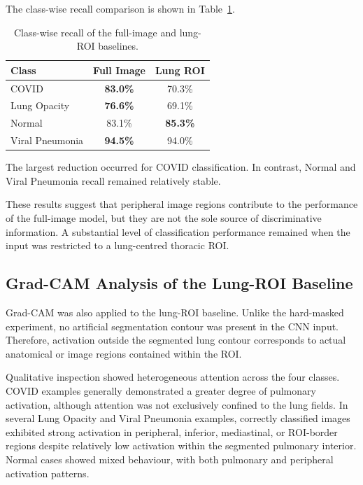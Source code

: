The class-wise recall comparison is shown in
Table~\ref{tab:baseline_recall_comparison}.

\begin{table}[H]
\centering
\caption{Class-wise recall of the full-image and lung-ROI baselines.}
\label{tab:baseline_recall_comparison}
\begin{tabular}{lcc}
\toprule
\textbf{Class} & \textbf{Full Image} & \textbf{Lung ROI} \\
\midrule
COVID            & \textbf{83.0\%} & 70.3\% \\
Lung Opacity     & \textbf{76.6\%} & 69.1\% \\
Normal           & 83.1\% & \textbf{85.3\%} \\
Viral Pneumonia  & \textbf{94.5\%} & 94.0\% \\
\bottomrule
\end{tabular}
\end{table}

The largest reduction occurred for COVID classification. In contrast, Normal
and Viral Pneumonia recall remained relatively stable.

These results suggest that peripheral image regions contribute to the
performance of the full-image model, but they are not the sole source of
discriminative information. A substantial level of classification performance
remained when the input was restricted to a lung-centred thoracic ROI.

\subsection{Grad-CAM Analysis of the Lung-ROI Baseline}
\label{subsec:roi_gradcam}

Grad-CAM was also applied to the lung-ROI baseline. Unlike the hard-masked
experiment, no artificial segmentation contour was present in the CNN input.
Therefore, activation outside the segmented lung contour corresponds to actual
anatomical or image regions contained within the ROI.

Qualitative inspection showed heterogeneous attention across the four classes.
COVID examples generally demonstrated a greater degree of pulmonary
activation, although attention was not exclusively confined to the lung
fields. In several Lung Opacity and Viral Pneumonia examples, correctly
classified images exhibited strong activation in peripheral, inferior,
mediastinal, or ROI-border regions despite relatively low activation within
the segmented pulmonary interior. Normal cases showed mixed behaviour, with both pulmonary and peripheral
activation patterns.

